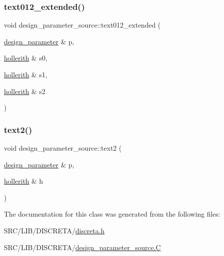 \subsubsection{\texorpdfstring{text012\+\_\+extended()}{text012\_extended()}}
{\footnotesize\ttfamily void design\+\_\+parameter\+\_\+source\+::text012\+\_\+extended (\begin{DoxyParamCaption}\item[{\mbox{\hyperlink{classdesign__parameter}{design\+\_\+parameter}} \&}]{p,  }\item[{\mbox{\hyperlink{classhollerith}{hollerith}} \&}]{s0,  }\item[{\mbox{\hyperlink{classhollerith}{hollerith}} \&}]{s1,  }\item[{\mbox{\hyperlink{classhollerith}{hollerith}} \&}]{s2 }\end{DoxyParamCaption})}

\mbox{\label{classdesign__parameter__source_a729d62efa57d73e420470d47902c4bf2}} 
\subsubsection{\texorpdfstring{text2()}{text2()}}
{\footnotesize\ttfamily void design\+\_\+parameter\+\_\+source\+::text2 (\begin{DoxyParamCaption}\item[{\mbox{\hyperlink{classdesign__parameter}{design\+\_\+parameter}} \&}]{p,  }\item[{\mbox{\hyperlink{classhollerith}{hollerith}} \&}]{h }\end{DoxyParamCaption})}



The documentation for this class was generated from the following files\+:\begin{DoxyCompactItemize}
\item 
S\+R\+C/\+L\+I\+B/\+D\+I\+S\+C\+R\+E\+T\+A/\mbox{\hyperlink{discreta_8h}{discreta.\+h}}\item 
S\+R\+C/\+L\+I\+B/\+D\+I\+S\+C\+R\+E\+T\+A/\mbox{\hyperlink{design__parameter__source_8_c}{design\+\_\+parameter\+\_\+source.\+C}}\end{DoxyCompactItemize}
